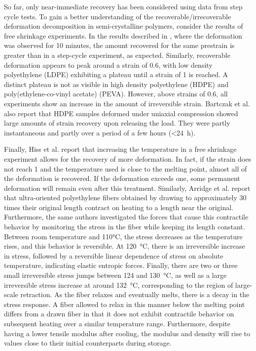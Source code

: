 So far, only near-immediate recovery has been considered using data from step cycle tests.
To gain a better understanding of the recoverable/irrecoverable deformation decomposition in semi-crystalline polymers, consider the results of free shrinkage experiments.
In the results described in \cite{hissNetworkStretchingSlip1999}, where the deformation was observed for 10 minutes, the amount recovered for the same prestrain is greater than in a step-cycle experiment, as expected.
Similarly, recoverable deformation appears to peak around a strain of 0.6, with low density polyethylene (LDPE) exhibiting a plateau until a strain of 1 is reached.
A distinct plateau is not as visible in high density polyethylene (HDPE) and poly(ethylene-co-vinyl acetate) (PEVA).
However, above strains of 0.6, all experiments show an increase in the amount of irreversible strain.
Bartczak et al. \citep{bartczakEvolutionCrystallineTexture1992} also report that HDPE samples deformed under uniaxial compression showed large amounts of strain recovery upon releasing the load.
They were partly instantaneous and partly over a period of a few hours (<\SI{24}{\hour}).

Finally, Hiss et al. \citep{hissNetworkStretchingSlip1999} report that increasing the temperature in a free shrinkage experiment allows for the recovery of more deformation.
In fact, if the strain does not reach 1 and the temperature used is close to the melting point, almost all of the deformation is recovered.
If the deformation exceeds one, some permanent deformation will remain even after this treatment.
Similarly, Arridge et al. \citep{arridgeSelfhardeningHighlyOriented1977} report that ultra-oriented polyethylene fibers obtained by drawing to approximately 30 times their original length contract on heating to a length near the original.
Furthermore, the same authors investigated the forces that cause this contractile behavior by monitoring the stress in the fiber while keeping its length constant.
Between room temperature and 110°C, the stress decreases as the temperature rises, and this behavior is reversible.
At \SI{120}{\celsius}, there is an irreversible increase in stress, followed by a reversible linear dependence of stress on absolute temperature, indicating elastic entropic forces.
Finally, there are two or three small irreversible stress jumps between \num{124} and \SI{130}{\celsius}, as well as a large irreversible stress increase at around \SI{132}{\celsius}, corresponding to the region of large-scale retraction.
As the fiber relaxes and eventually melts, there is a decay in the stress response.
A fiber allowed to relax in this manner below the melting point differs from a drawn fiber in that it does not exhibit contractile behavior on subsequent heating over a similar temperature range.
Furthermore, despite having a lower tensile modulus after cooling, the modulus and density will rise to values close to their initial counterparts during storage.

